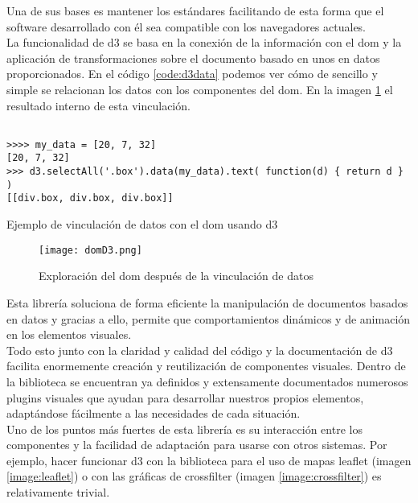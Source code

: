 Una de sus bases es mantener los estándares facilitando  de esta forma que el \gls{software} desarrollado con él  sea compatible con los navegadores actuales.\\

La funcionalidad de \gls{d3} se basa en la conexión de la información con el \gls{dom} y la aplicación de transformaciones sobre el documento basado en unos en datos proporcionados. En el código \ref{code:d3data} podemos ver cómo de sencillo y simple se relacionan los datos con los componentes del \gls{dom}. En la imagen \ref{image:d3dataimage} el resultado interno de esta vinculación.\\


\begin{listing}
\begin{verbatim}
               
>>>> my_data = [20, 7, 32]
[20, 7, 32]
>>> d3.selectAll('.box').data(my_data).text( function(d) { return d } )
[[div.box, div.box, div.box]]

	\end{verbatim}
	\caption{Ejemplo de vinculación de datos con el \gls{dom} usando \gls{d3} \cite{D3exp2012}}
	\label{code:d3data}
\end{listing}

\begin{figure}[h!]
  \centering
    \texttt{[image: domD3.png]}
  \caption{Exploración del \gls{dom} después de la vinculación de datos \cite{D3exp2012}}
  \label{image:d3dataimage}
\end{figure}



Esta librería soluciona de forma eficiente la manipulación de documentos basados en datos y gracias a ello, permite que comportamientos dinámicos y de animación en los elementos visuales.\\

Todo esto junto con la claridad y calidad del código y la documentación de \gls{d3} facilita enormemente creación y reutilización de componentes visuales. Dentro de la biblioteca se encuentran ya definidos y extensamente documentados numerosos \glspl{plugin} visuales que ayudan para desarrollar nuestros propios elementos, adaptándose fácilmente a las necesidades de cada situación.\\

Uno de los puntos más fuertes de esta librería es su interacción entre los componentes y la facilidad de adaptación para usarse con otros sistemas. Por ejemplo, hacer funcionar \gls{d3} con la biblioteca para el uso de mapas \gls{leaflet} (imagen \ref{image:leaflet}) o con las gráficas de \gls{crossfilter} (imagen \ref{image:crossfilter}) es relativamente trivial.\\


